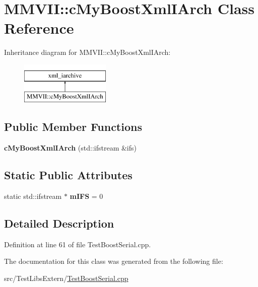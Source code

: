 \hypertarget{classMMVII_1_1cMyBoostXmlIArch}{}\section{M\+M\+V\+II\+:\+:c\+My\+Boost\+Xml\+I\+Arch Class Reference}
\label{classMMVII_1_1cMyBoostXmlIArch}
Inheritance diagram for M\+M\+V\+II\+:\+:c\+My\+Boost\+Xml\+I\+Arch\+:\begin{figure}[H]
\begin{center}
\leavevmode
\includegraphics[height=2.000000cm]{classMMVII_1_1cMyBoostXmlIArch}
\end{center}
\end{figure}
\subsection*{Public Member Functions}
\begin{DoxyCompactItemize}
\item 
{\bfseries c\+My\+Boost\+Xml\+I\+Arch} (std\+::ifstream \&ifs)\hypertarget{classMMVII_1_1cMyBoostXmlIArch_a64c4efc0645488fef76498e10f4471e2}{}\label{classMMVII_1_1cMyBoostXmlIArch_a64c4efc0645488fef76498e10f4471e2}

\end{DoxyCompactItemize}
\subsection*{Static Public Attributes}
\begin{DoxyCompactItemize}
\item 
static std\+::ifstream $\ast$ {\bfseries m\+I\+FS} = 0\hypertarget{classMMVII_1_1cMyBoostXmlIArch_a9495ace9adc058598e54d925de805648}{}\label{classMMVII_1_1cMyBoostXmlIArch_a9495ace9adc058598e54d925de805648}

\end{DoxyCompactItemize}


\subsection{Detailed Description}


Definition at line 61 of file Test\+Boost\+Serial.\+cpp.



The documentation for this class was generated from the following file\+:\begin{DoxyCompactItemize}
\item 
src/\+Test\+Libs\+Extern/\hyperlink{TestBoostSerial_8cpp}{Test\+Boost\+Serial.\+cpp}\end{DoxyCompactItemize}
